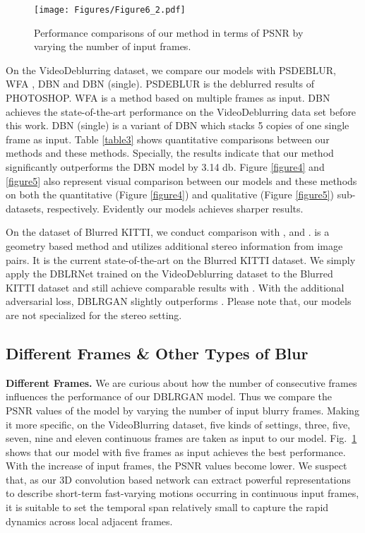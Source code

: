 \documentclass[journal]{IEEEtran}
\begin{document}
\begin{figure}[tb]
	\centering
	\texttt{[image: Figures/Figure6\_2.pdf]}
	\caption{Performance comparisons of our method in terms of PSNR by varying the number of input frames.}
	\label{figure7}
\end{figure}




On the VideoDeblurring dataset, we compare our models with PSDEBLUR, WFA \cite{delbracio2015burst}, DBN \cite{su2016deep} and DBN (single). PSDEBLUR is the deblurred results of PHOTOSHOP. WFA is a method based on multiple frames as input. DBN achieves the state-of-the-art performance on the VideoDeblurring data set before this work. DBN (single) is a variant of DBN which stacks 5 copies of one single frame as input. Table \ref{table3} shows quantitative comparisons between our methods and these methods. Specially, the results indicate that our method significantly outperforms the DBN model by 3.14 db. Figure \ref{figure4} and \ref{figure5} also represent visual comparison between our models and these methods on both the quantitative (Figure \ref{figure4}) and qualitative (Figure \ref{figure5}) sub-datasets, respectively. Evidently our models achieves sharper results.


On the dataset of Blurred KITTI, we conduct comparison with \cite{hyun2015generalized}, \cite{sellent2016stereo} and \cite{pan2017simultaneous}. \cite{pan2017simultaneous} is a geometry based method and utilizes additional stereo information from image pairs. It is the current state-of-the-art on the Blurred KITTI dataset. We simply apply the DBLRNet trained on the VideoDeblurring dataset to the Blurred KITTI dataset and still achieve comparable results with \cite{pan2017simultaneous}. With the additional adversarial loss, DBLRGAN slightly outperforms \cite{pan2017simultaneous}. Please note that, our models are not specialized for the stereo setting.

\subsection{Different Frames \& Other Types of Blur}
\label{more_analysis}
\textbf{Different Frames.} We are curious about how the number of consecutive frames influences the performance of our DBLRGAN model. Thus we compare the PSNR values of the model by varying the number of input blurry frames. Making it more specific, on the VideoBlurring dataset, five kinds of settings, three, five, seven, nine and eleven continuous frames are taken as input to our model. Fig.~\ref{figure7} shows that our model with five frames as input achieves the best performance. With the increase of input frames, the PSNR values become lower. We suspect that, as our 3D convolution based network can extract powerful representations to describe short-term fast-varying motions occurring in continuous input frames, it is suitable to set the temporal span relatively small to capture the rapid dynamics across local adjacent frames.
\end{document}
